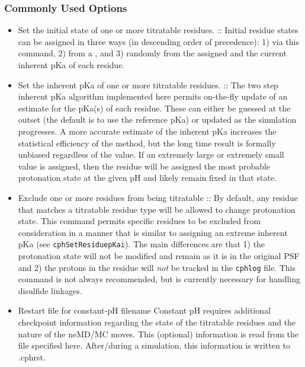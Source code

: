 \subsubsection{Commonly Used Options}
\begin{itemize}
\item {}
{Set the initial state of one or more titratable residues.}
{
::  \OARG{\ldots}
}
{
Initial residue states can be assigned in three ways (in descending order of 
  precedence): 1) via this command, 2) from a , and 3)
  randomly from the assigned  and the current inherent pKa of each
  residue.
}

\item {}
{Set the inherent pKa of one or more titratable residues.}
{
::  \OARG{\ldots} 
}
{
The two step inherent pKa algorithm implemented here permits on-the-fly update
  of an estimate for the pKa(s) of each residue.
These can either be guessed at the outset (the default is to use the reference
  pKa) or updated as the simulation progresses.
A more accurate estimate of the inherent pKa increases the statistical
  efficiency of the method, but the long time result is formally unbiased
  regardless of the value.
If an extremely large or extremely small value is assigned, then the residue
  will be assigned the most probable protonation state at the given pH and
  likely remain fixed in that state.
}

\item {}
{Exclude one or more residues from being titratable}
{
:: \OARG{\ldots}
}
{
By default, any residue that matches a titratable residue type will be allowed
  to change protonation state.
This command permits specific residues to be excluded from consideration in a
  manner that is similar to assigning an extreme inherent pKa (see
  \texttt{cphSetResiduepKai}).
The main differences are that 1) the protonation state will not be modified and
  remain as it is in the original PSF and 2) the protons in the residue will
  \emph{not} be tracked in the \texttt{cphlog} file.
This command is not always recommended, but is currently necessary for handling
  disulfide linkages.
}

\item {}
{Restart file for constant-pH}
{filename}
{
Constant pH requires additional checkpoint information regarding the state of
  the titratable residues and the nature of the neMD/MC moves.
This (optional) information is read from the file specified here.
After/during a simulation, this information is written to 
  \KEY{[outputname]}.cphrst.
}


\end{itemize}
